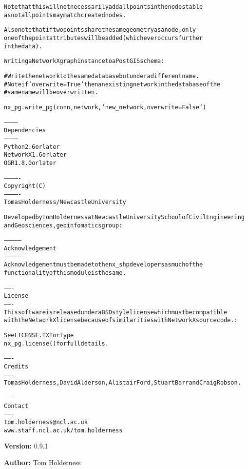\begin{alltt}
        Note that this will not necessarily add all points in the nodes table 
        as not all points may match created nodes.
        
        Also note that if two points share the same geometry as a node, only
        one of the point attributes will be added (whichever occurs further 
        in the data).
    

Writing a NetworkX graph instance to a PostGIS schema:
    
    \# Write the network to the same database but under a different name.
    \# Note if 'overwrite=True' then an existing network in the database of the 
    \# same name will be overwritten.
    
    nx\_pg.write\_pg(conn, network, 'new\_network, overwrite=False')
    
------------
Dependencies
------------
Python 2.6 or later
NetworkX 1.6 or later
OGR 1.8.0 or later

-------------
Copyright (C)
-------------
Tomas Holderness / Newcastle University

Developed by Tom Holderness at Newcastle University School of Civil Engineering
and Geosciences, geoinfomatics group:

---------------
Acknowledgement 
---------------
Acknowledgement must be made to the nx\_shp developers as much of the 
functionality of this module is the same.

-------
License
-------
This software is released under a BSD style license which must be compatible
with the NetworkX license because of similarities with NetworkX source code.:
    
See LICENSE.TXT or type
nx\_pg.license() for full details.

-------
Credits
-------
Tomas Holderness, David Alderson, Alistair Ford, Stuart Barr and Craig Robson.

-------
Contact
-------
tom.holderness@ncl.ac.uk
www.staff.ncl.ac.uk/tom.holderness
\end{alltt}

\textbf{Version:} 0.9.1



\textbf{Author:} Tom Holderness





